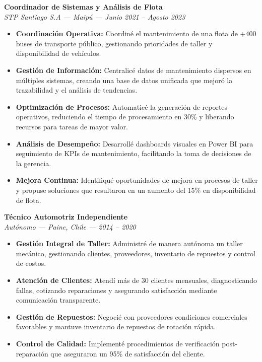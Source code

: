 \documentclass[10pt,letterpaper]{article}
\begin{document}
\noindent \textbf{Coordinador de Sistemas y Análisis de Flota} \\
\textit{STP Santiago S.A — Maipú — Junio 2021 – Agosto 2023}
\begin{itemize}
    \item \textbf{Coordinación Operativa:} Coordiné el mantenimiento de una flota de +400 buses de transporte público, gestionando prioridades de taller y disponibilidad de vehículos.
    \item \textbf{Gestión de Información:} Centralicé datos de mantenimiento dispersos en múltiples sistemas, creando una base de datos unificada que mejoró la trazabilidad y el análisis de tendencias.
    \item \textbf{Optimización de Procesos:} Automaticé la generación de reportes operativos, reduciendo el tiempo de procesamiento en 30\% y liberando recursos para tareas de mayor valor.
    \item \textbf{Análisis de Desempeño:} Desarrollé dashboards visuales en Power BI para seguimiento de KPIs de mantenimiento, facilitando la toma de decisiones de la gerencia.
    \item \textbf{Mejora Continua:} Identifiqué oportunidades de mejora en procesos de taller y propuse soluciones que resultaron en un aumento del 15\% en disponibilidad de flota.
\end{itemize}

\vspace{0.2cm}

\noindent \textbf{Técnico Automotriz Independiente} \\
\textit{Autónomo — Paine, Chile — 2014 – 2020}
\begin{itemize}
    \item \textbf{Gestión Integral de Taller:} Administré de manera autónoma un taller mecánico, gestionando clientes, proveedores, inventario de repuestos y control de costos.
    \item \textbf{Atención de Clientes:} Atendí más de 30 clientes mensuales, diagnosticando fallas, cotizando reparaciones y asegurando satisfacción mediante comunicación transparente.
    \item \textbf{Gestión de Repuestos:} Negocié con proveedores condiciones comerciales favorables y mantuve inventario de repuestos de rotación rápida.
    \item \textbf{Control de Calidad:} Implementé procedimientos de verificación post-reparación que aseguraron un 95\% de satisfacción del cliente.
\end{itemize}
\end{document}
